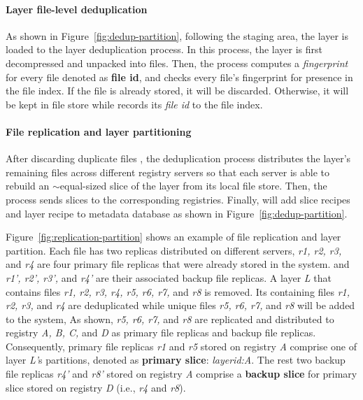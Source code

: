 \paragraph{Layer file-level deduplication}
As shown in Figure~\ref{fig:dedup-partition}, 
following the staging area, the layer is loaded to the layer deduplication process.
In this process, the layer is first decompressed and unpacked into files.
Then, 
the process computes a \emph{fingerprint} for every file denoted as \textbf{file id}, 
and checks every file's fingerprint for presence in the file index.
If the file is already stored, it will be discarded. 
Otherwise, it will be kept in file store while
\sysname records its \emph{file id} to the file index.

\paragraph{File replication and layer partitioning}

After discarding duplicate files%
, the deduplication process distributes the layer's remaining files across different registry servers
so that each server is able to rebuild an $\sim$equal-sized slice of the layer from its local file store.
Then, the process sends slices to the corresponding registries.
Finally, \sysname will add slice recipes and layer recipe to metadata database as shown in Figure~\ref{fig:dedup-partition}.

Figure~\ref{fig:replication-partition} shows an example of file replication and layer partition.
Each file has two replicas distributed on different servers,
\emph{r1, r2, r3,} and \emph{r4} are four primary file replicas that were already stored in the system.
and \emph{r1', r2', r3',} and \emph{r4'} are their associated backup file replicas. 
A layer \emph{L} that contains files \emph{r1, r2, r3, r4, r5, r6, r7,} and \emph{r8} is removed.
Its containing files \emph{r1, r2, r3,} and \emph{r4} are deduplicated
while unique files
\emph{r5, r6, r7,} and \emph{r8} will be added to the system, 
As shown, \emph{r5, r6, r7,} and \emph{r8} are replicated and distributed to registry \emph{A, B, C,} and \emph{D} 
as primary file replicas and backup file replicas.
Consequently,
primary file replicas \emph{r1} and \emph{r5} stored on registry \emph{A} comprise one of layer \emph{L'}s partitions, 
denoted as \textbf{primary slice}:
\emph{layerid:A}.
The rest two backup file replicas \emph{r4'} and \emph{r8'} stored on registry \emph{A} comprise a \textbf{backup slice} for primary slice stored 
on registry \emph{D} (i.e., \emph{r4} and \emph{r8}).

